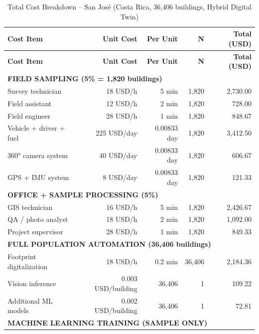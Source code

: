 \begin{longtable}{lrrrr}
\caption{Total Cost Breakdown – San José (Costa Rica, 36,406 buildings, Hybrid Digital Twin)} \\
\hline
\textbf{Cost Item} & \textbf{Unit Cost} & \textbf{Per Unit} & \textbf{N} & \textbf{Total (USD)} \\
\hline
\endfirsthead

\hline
\textbf{Cost Item} & \textbf{Unit Cost} & \textbf{Per Unit} & \textbf{N} & \textbf{Total (USD)} \\
\hline
\endhead

\multicolumn{5}{l}{\textbf{FIELD SAMPLING (5\% = 1,820 buildings)}} \\

Survey technician & 18 USD/h & 5 min & 1,820 & 2,730.00 \\
Field assistant & 12 USD/h & 2 min & 1,820 & 728.00 \\
Field engineer & 28 USD/h & 1 min & 1,820 & 848.67 \\

Vehicle + driver + fuel & 225 USD/day & 0.00833 day & 1,820 & 3,412.50 \\
360° camera system & 40 USD/day & 0.00833 day & 1,820 & 606.67 \\
GPS + IMU system & 8 USD/day & 0.00833 day & 1,820 & 121.33 \\
\hline

\multicolumn{5}{l}{\textbf{OFFICE + SAMPLE PROCESSING (5\%)}} \\

GIS technician & 16 USD/h & 5 min & 1,820 & 2,426.67 \\
QA / photo analyst & 18 USD/h & 2 min & 1,820 & 1,092.00 \\
Project supervisor & 28 USD/h & 1 min & 1,820 & 849.33 \\
\hline

\multicolumn{5}{l}{\textbf{FULL POPULATION AUTOMATION (36,406 buildings)}} \\

Footprint digitalization & 18 USD/h & 0.2 min & 36,406 & 2,184.36 \\

Vision inference & 0.003 USD/building & 36,406 & 1 & 109.22 \\
Additional ML models & 0.002 USD/building & 36,406 & 1 & 72.81 \\
\hline

\multicolumn{5}{l}{\textbf{MACHINE LEARNING TRAINING (SAMPLE ONLY)}} \\


\end{longtable}
